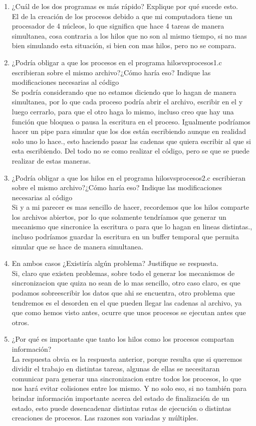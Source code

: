 \documentclass[10pt]{article}
\begin{document}
		\begin{enumerate}
		\item ¿Cuál de los dos programas es más rápido? Explique por qué sucede esto.
		\\El de la creación de los procesos debido a que mi computadora tiene  un procesador de 4  núcleos, lo que significa que hace 4 tareas de manera simultanea, cosa contraria a los hilos que no son al mismo tiempo, si no mas bien simulando esta situación, si bien con mas hilos, pero no se compara.
		\item ¿Podría obligar a que los procesos en el programa hilosvsprocesos1.c escribieran sobre el mismo archivo?¿Cómo haría eso? Indique las modificaciones necesarias al código
		\\Se podría considerando que no estamos diciendo que lo hagan de manera simultanea, por lo que cada proceso podría abrir el archivo, escribir en el y luego cerrarlo, para que el otro haga lo mismo, incluso creo que hay una función que bloquea o pausa la escritura en el proceso. Igualmente podríamos hacer un pipe para simular que los dos están escribiendo aunque en realidad solo uno lo hace., esto haciendo pasar las cadenas que quiera escribir al que si esta escribiendo. Del todo no se como realizar el código, pero se que se puede realizar de estas maneras. 
		\item ¿Podría obligar a que los hilos en el programa hilosvsprocesos2.c escribieran sobre el mismo archivo?¿Cómo haría eso? Indique las modificaciones necesarias al código
		\\Si y a mi parecer es mas sencillo de hacer, recordemos que los hilos comparte los archivos abiertos, por lo que solamente tendríamos que generar un mecanismo que sincronice la escritura o para que lo hagan en lineas distintas., incluso podríamos guardar la escritura en un buffer temporal que permita simular que se hace de manera simultanea.
		\item En ambos casos ¿Existiría algún problema? Justifique se respuesta.
		\\Si, claro que existen problemas, sobre todo el generar los mecanismos de sincronizacion que quiza no sean de lo mas sencillo, otro caso claro, es que podamos sobreescribir los datos que ahi se encuentra, otro problema que tendremos es el desorden en el que pueden llegar las cadenas al archivo, ya que como hemos visto antes, ocurre que unos procesos se ejecutan antes que otros.
		\item ¿Por qué es importante que tanto los hilos como los procesos compartan información?
		\\La respuesta obvia es  la respuesta anterior,  porque resulta que si queremos dividir el trabajo en distintas tareas, algunas de ellas se necesitaran comunicar para generar una sincronizacion entre todos los procesos, lo que nos hará evitar colisiones entre los mismo. Y no solo eso, si no también para brindar información importante acerca del estado de finalización de un estado, esto puede desencadenar distintas rutas de ejecución o distintas creaciones de procesos. Las razones son variadas y múltiples.  
	\end{enumerate}
	
\end{document}
